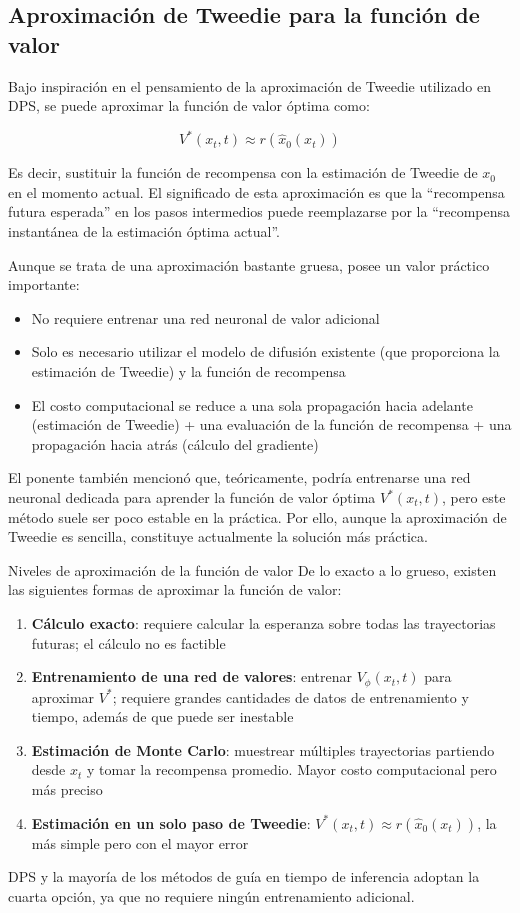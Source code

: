 \documentclass[a4paper]{article}
\begin{document}
\subsection{Aproximación de Tweedie para la función de valor}

Bajo inspiración en el pensamiento de la aproximación de Tweedie utilizado en DPS, se puede aproximar la función de valor óptima como:

$$V^*(x_t, t) \approx r(\hat{x}_0(x_t))$$

Es decir, sustituir la función de recompensa con la estimación de Tweedie de $x_0$ en el momento actual. El significado de esta aproximación es que la ``recompensa futura esperada'' en los pasos intermedios puede reemplazarse por la ``recompensa instantánea de la estimación óptima actual''.

Aunque se trata de una aproximación bastante gruesa, posee un valor práctico importante:

\begin{itemize}
    \item No requiere entrenar una red neuronal de valor adicional
    \item Solo es necesario utilizar el modelo de difusión existente (que proporciona la estimación de Tweedie) y la función de recompensa
    \item El costo computacional se reduce a una sola propagación hacia adelante (estimación de Tweedie) + una evaluación de la función de recompensa + una propagación hacia atrás (cálculo del gradiente)
\end{itemize}

El ponente también mencionó que, teóricamente, podría entrenarse una red neuronal dedicada para aprender la función de valor óptima $V^*(x_t, t)$, pero este método suele ser poco estable en la práctica. Por ello, aunque la aproximación de Tweedie es sencilla, constituye actualmente la solución más práctica.

\begin{warningbox}{Niveles de aproximación de la función de valor}
De lo exacto a lo grueso, existen las siguientes formas de aproximar la función de valor:
\begin{enumerate}
    \item \textbf{Cálculo exacto}: requiere calcular la esperanza sobre todas las trayectorias futuras; el cálculo no es factible
    \item \textbf{Entrenamiento de una red de valores}: entrenar $V_\phi(x_t, t)$ para aproximar $V^*$; requiere grandes cantidades de datos de entrenamiento y tiempo, además de que puede ser inestable
    \item \textbf{Estimación de Monte Carlo}: muestrear múltiples trayectorias partiendo desde $x_t$ y tomar la recompensa promedio. Mayor costo computacional pero más preciso
    \item \textbf{Estimación en un solo paso de Tweedie}: $V^*(x_t, t) \approx r(\hat{x}_0(x_t))$, la más simple pero con el mayor error
\end{enumerate}
DPS y la mayoría de los métodos de guía en tiempo de inferencia adoptan la cuarta opción, ya que no requiere ningún entrenamiento adicional.
\end{warningbox}
\end{document}
